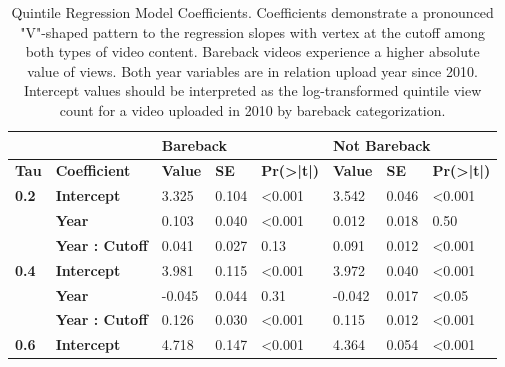 \documentclass[]{article}
\begin{document}
\begin{table}[]
\centering
\caption{Quintile Regression Model Coefficients. Coefficients demonstrate a pronounced "V"-shaped pattern to the regression slopes with vertex at the cutoff among both types of video content. Bareback videos experience a higher absolute value of views. Both year variables are in relation upload year since 2010. Intercept values should be interpreted as the log-transformed quintile view count for a video uploaded in 2010 by bareback categorization.}
\label{table1}
\begin{tabular}{@{}l|l|lll|lll@{}}
\toprule
\multicolumn{2}{l|}{}                                  & \multicolumn{3}{l|}{\textbf{Bareback}}                       & \multicolumn{3}{l}{\textbf{Not Bareback}}                  \\ \midrule
\textbf{Tau}                  & \textbf{Coefficient}   & \textbf{Value} & \textbf{SE} & \textbf{Pr(\textgreater|t|)} & \textbf{Value} & \textbf{SE} & \textbf{Pr(\textgreater|t|)} \\ \midrule
\multirow{3}{*}{\textbf{0.2}} & \textbf{Intercept}     & 3.325          & 0.104       & \textless 0.001              & 3.542          & 0.046       & \textless 0.001              \\
                              & \textbf{Year}          & 0.103          & 0.040       & \textless 0.001              & 0.012          & 0.018       & 0.50                         \\
                              & \textbf{Year : Cutoff} & 0.041          & 0.027       & 0.13                         & 0.091          & 0.012       & \textless 0.001              \\ \midrule
\multirow{3}{*}{\textbf{0.4}} & \textbf{Intercept}     & 3.981          & 0.115       & \textless 0.001              & 3.972          & 0.040       & \textless 0.001              \\
                              & \textbf{Year}          & -0.045         & 0.044       & 0.31                         & -0.042         & 0.017       & \textless 0.05               \\
                              & \textbf{Year : Cutoff} & 0.126          & 0.030       & \textless 0.001              & 0.115          & 0.012       & \textless 0.001              \\ \midrule
\multirow{3}{*}{\textbf{0.6}} & \textbf{Intercept}     & 4.718          & 0.147       & \textless 0.001              & 4.364          & 0.054       & \textless 0.001              \\

\end{tabular}
\end{table}
\end{document}
